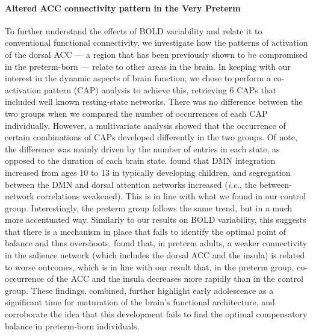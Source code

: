 \paragraph{Altered ACC connectivity pattern in the Very Preterm}
To further understand the effects of BOLD variability and relate it to conventional functional connectivity, we investigate how the patterns of activation of the dorsal ACC --- a region that has been previously shown to be compromised in the preterm-born  \citep{White2014, Daamen2015, Lordier2019} --- relate to other areas in the brain. In keeping with our interest in the dynamic aspects of brain function, we chose to perform a co-activation pattern (CAP) analysis to achieve this, retrieving 6 CAPs that included well known resting-state networks. There was no difference between the two groups when we compared the number of occurrences of each CAP individually. However, a multivariate analysis showed that the occurrence of certain combinations of CAPs developed differently in the two groups. Of note, the difference was mainly driven by the number of entries in each state, as opposed to the duration of each brain state. \cite{Sherman2014} found that DMN integration increased from ages 10 to 13 in typically developing children, and segregation between the DMN and dorsal attention networks increased (\textit{i.e.}, the between-network correlations weakened). This is in line with what we found in our control group. Interestingly, the preterm group follows the same trend, but in a much more accentuated way. Similarly to our results on BOLD variability, this suggests that there is a mechanism in place that fails to identify the optimal point of balance and thus overshoots.  \cite{Nosarti2006} found that, in preterm adults, a weaker connectivity in the salience network (which includes the dorsal ACC and the insula) is related to worse outcomes, which is in line with our result that, in the preterm group, co-occurrence of the ACC and the insula decreases more rapidly than in the control group.  These findings, combined, further highlight early adolescence as a significant time for maturation of the brain's functional architecture, and corroborate the idea that this development fails to find the optimal compensatory balance in preterm-born individuals.


